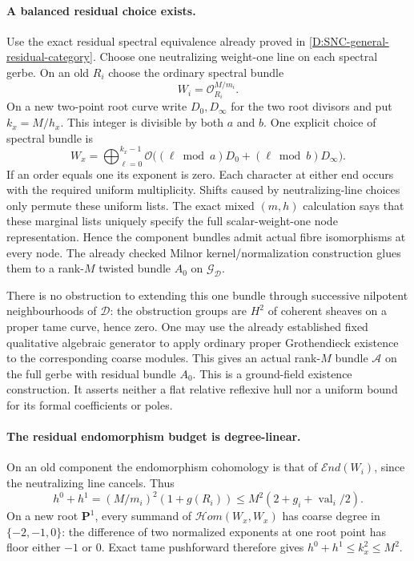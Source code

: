 \paragraph{A balanced residual choice exists.}
Use the exact residual spectral equivalence already proved in
\ref{D:SNC-general-residual-category}. Choose one neutralizing
weight-one line on each spectral gerbe. On an old $R_i$ choose the
ordinary spectral bundle
\[
                    W_i=\mathcal O_{R_i}^{M/m_i}.
\]
On a new two-point root curve write $D_0,D_\infty$ for the two root
divisors and put $k_x=M/h_x$. This integer is divisible by both
$a$ and $b$. One explicit choice of spectral bundle is
\[
 W_x=\bigoplus_{\ell=0}^{k_x-1}
  \mathcal O\bigl((\ell\bmod a)D_0+(\ell\bmod b)D_\infty\bigr).
\]
If an order equals one its exponent is zero. Each character at either
end occurs with the required uniform multiplicity. Shifts caused by
neutralizing-line choices only permute these uniform lists. The exact
mixed $(m,h)$ calculation says that these marginal lists uniquely
specify the full scalar-weight-one node representation. Hence the
component bundles admit actual fibre isomorphisms at every node.
The already checked Milnor kernel/normalization construction glues
them to a rank-$M$ twisted bundle $A_0$ on $\mathcal G_{\mathcal D}$.

There is no obstruction to extending this one bundle through successive
nilpotent neighbourhoods of $\mathcal D$: the obstruction groups are
$H^2$ of coherent sheaves on a proper tame curve, hence zero. One may
use the already established fixed qualitative algebraic generator to
apply ordinary proper Grothendieck existence to the corresponding
coarse modules. This gives an actual rank-$M$ bundle $\mathcal A$ on
the full gerbe with residual bundle $A_0$. This is a ground-field
existence construction. It asserts neither a flat relative reflexive
hull nor a uniform bound for its formal coefficients or poles.

\paragraph{The residual endomorphism budget is degree-linear.}
On an old component the endomorphism cohomology is that of
$\mathcal End(W_i)$, since the neutralizing line cancels. Thus
\[
 h^0+h^1=(M/m_i)^2(1+g(R_i))
       \le M^2(2+g_i+\operatorname{val}_i/2).
\]
On a new root $\mathbf P^1$, every summand of
$\mathcal Hom(W_x,W_x)$ has coarse degree in $\{-2,-1,0\}$:
the difference of two normalized exponents at one root point has
floor either $-1$ or $0$. Exact tame pushforward therefore gives
$h^0+h^1\le k_x^2\le M^2$.

